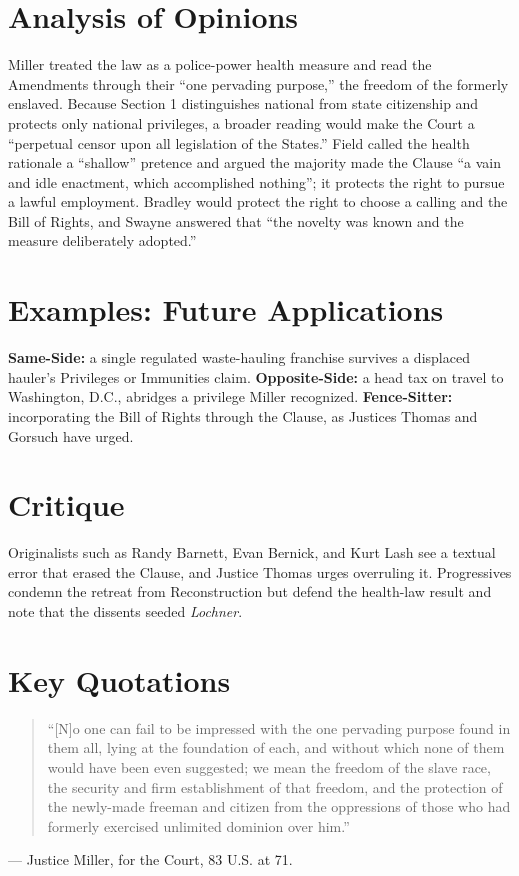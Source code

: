\documentclass[12pt]{article}
\begin{document}
\section{Analysis of Opinions}
Miller treated the law as a police-power health measure and read the Amendments through their ``one pervading purpose,'' the freedom of the formerly enslaved. Because Section 1 distinguishes national from state citizenship and protects only national privileges, a broader reading would make the Court a ``perpetual censor upon all legislation of the States.'' Field called the health rationale a ``shallow'' pretence and argued the majority made the Clause ``a vain and idle enactment, which accomplished nothing''; it protects the right to pursue a lawful employment. Bradley would protect the right to choose a calling and the Bill of Rights, and Swayne answered that ``the novelty was known and the measure deliberately adopted.''

\section{Examples: Future Applications}
\textbf{Same-Side:} a single regulated waste-hauling franchise survives a displaced hauler's Privileges or Immunities claim. \textbf{Opposite-Side:} a head tax on travel to Washington, D.C., abridges a privilege Miller recognized. \textbf{Fence-Sitter:} incorporating the Bill of Rights through the Clause, as Justices Thomas and Gorsuch have urged.

\section{Critique}
Originalists such as Randy Barnett, Evan Bernick, and Kurt Lash see a textual error that erased the Clause, and Justice Thomas urges overruling it. Progressives condemn the retreat from Reconstruction but defend the health-law result and note that the dissents seeded \textit{Lochner}.

\section{Key Quotations}
\begin{quote}
``[N]o one can fail to be impressed with the one pervading purpose found in them all, lying at the foundation of each, and without which none of them would have been even suggested; we mean the freedom of the slave race, the security and firm establishment of that freedom, and the protection of the newly-made freeman and citizen from the oppressions of those who had formerly exercised unlimited dominion over him.''
\end{quote}
\noindent --- Justice Miller, for the Court, 83 U.S. at 71.
\end{document}

